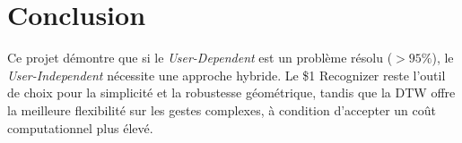 \documentclass[a4paper,11pt]{article}
\begin{document}
\section{Conclusion}
Ce projet démontre que si le \textit{User-Dependent} est un problème résolu ($>95\%$), le \textit{User-Independent} nécessite une approche hybride. Le \$1 Recognizer reste l'outil de choix pour la simplicité et la robustesse géométrique, tandis que la DTW offre la meilleure flexibilité sur les gestes complexes, à condition d'accepter un coût computationnel plus élevé.
\end{document}
